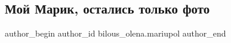  
 
 
 
 

\subsection{Мой Марик, остались только фото}
\label{sec:30_03_2022.fb.bilous_olena.mariupol.1.moj_marik_ostalis_tolko_foto}

\ifcmt
 author_begin
   author_id bilous_olena.mariupol
 author_end
\fi
